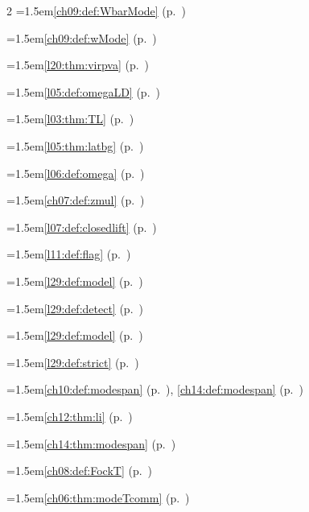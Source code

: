 \begin{multicols}{2}
\hangindent=1.5em\quad \ref{ch09:def:WbarMode} (p.~\pageref{ch09:def:WbarMode})\par
\hangindent=1.5em\quad \ref{ch09:def:wMode} (p.~\pageref{ch09:def:wMode})\par
\hangindent=1.5em\quad \ref{l20:thm:virpva} (p.~\pageref{l20:thm:virpva})\par
\hangindent=1.5em\quad \ref{l05:def:omegaLD} (p.~\pageref{l05:def:omegaLD})\par
\hangindent=1.5em\quad \ref{l03:thm:TL} (p.~\pageref{l03:thm:TL})\par
\hangindent=1.5em\quad \ref{l05:thm:latbg} (p.~\pageref{l05:thm:latbg})\par
\hangindent=1.5em\quad \ref{l06:def:omega} (p.~\pageref{l06:def:omega})\par
\hangindent=1.5em\quad \ref{ch07:def:zmul} (p.~\pageref{ch07:def:zmul})\par
\hangindent=1.5em\quad \ref{l07:def:closedlift} (p.~\pageref{l07:def:closedlift})\par
\hangindent=1.5em\quad \ref{l11:def:flag} (p.~\pageref{l11:def:flag})\par
\hangindent=1.5em\quad \ref{l29:def:model} (p.~\pageref{l29:def:model})\par
\hangindent=1.5em\quad \ref{l29:def:detect} (p.~\pageref{l29:def:detect})\par
\hangindent=1.5em\quad \ref{l29:def:model} (p.~\pageref{l29:def:model})\par
\hangindent=1.5em\quad \ref{l29:def:strict} (p.~\pageref{l29:def:strict})\par
\hangindent=1.5em\quad \ref{ch10:def:modespan} (p.~\pageref{ch10:def:modespan}), \ref{ch14:def:modespan} (p.~\pageref{ch14:def:modespan})\par
\hangindent=1.5em\quad \ref{ch12:thm:li} (p.~\pageref{ch12:thm:li})\par
\hangindent=1.5em\quad \ref{ch14:thm:modespan} (p.~\pageref{ch14:thm:modespan})\par
\hangindent=1.5em\quad \ref{ch08:def:FockT} (p.~\pageref{ch08:def:FockT})\par
\hangindent=1.5em\quad \ref{ch06:thm:modeTcomm} (p.~\pageref{ch06:thm:modeTcomm})\par

\end{multicols}
